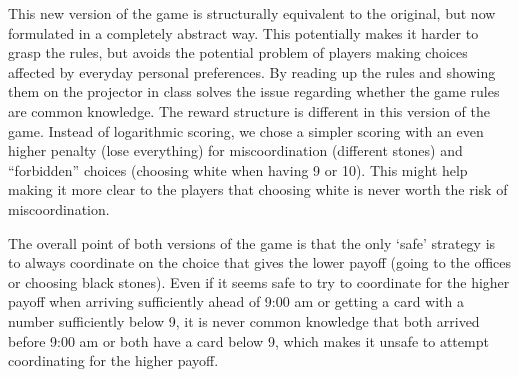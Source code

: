\documentclass[twocolumn,a4paper,superscriptaddress,nofootinbib]{revtex4}
\newcommand{\tsn}[1]{{\color{blue} TSN: #1}}
\newcommand{\add}[1]{{\color{green2} Add: #1}}
\begin{document}
This new version of the game is structurally equivalent to the original, but now formulated in a completely abstract way. This potentially makes it harder to grasp the rules, but avoids the potential problem of players making choices affected by everyday personal preferences. By reading up the rules and showing them on the projector in class solves the issue regarding whether the game rules are common knowledge. The reward structure is different in this version of the game. Instead of logarithmic scoring, we chose a simpler scoring with an even higher penalty (lose everything) for miscoordination (different stones) and ``forbidden'' choices (choosing white when having 9 or 10). This might help making it more clear to the players that choosing white is never worth the risk of miscoordination. %

The overall point of both versions of the game is that the only `safe' strategy is to always coordinate on the choice that gives the lower payoff (going to the offices or choosing black stones). Even if it seems safe to try to coordinate for the higher payoff when arriving sufficiently ahead of 9:00 am or getting a card with a number sufficiently below 9, it is never common knowledge that both arrived before 9:00 am or both have a card below 9, which makes it unsafe to attempt coordinating for the higher payoff. 


\end{document}
